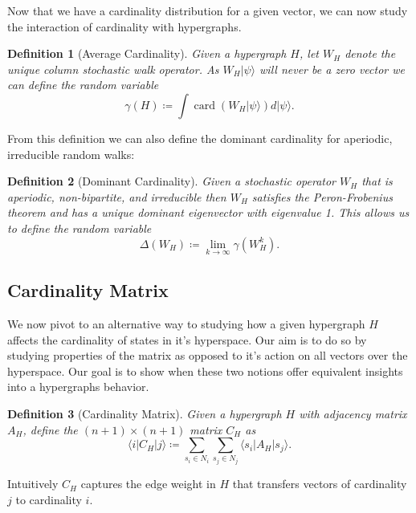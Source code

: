 \documentclass{article}
\newcommand{\ket}[1]{|#1\rangle}
\newcommand{\bra}[1]{\langle #1|}
\newcommand{\parens}[1]{\left( #1 \right)}
\DeclareMathOperator{\card}{card}
\newcommand{\cardi}[1]{\card \parens{ #1 }}
\newcommand{\base}[1]{\ket{s_{#1}}}
\newcommand{\dual}[1]{\bra{s_{#1}}}
\newtheorem{defn}{Definition}
\begin{document}
Now that we have a cardinality distribution for a given vector, we can now study the interaction of cardinality with hypergraphs.
\begin{defn}[Average Cardinality]
    Given a hypergraph $H$, let $W_H$ denote the unique column stochastic walk operator. As $W_H \ket{\psi}$ will never be a zero vector we can define the random variable
    \begin{equation}
        \gamma(H) \coloneqq \int \cardi{W_H \ket{\psi}} d\ket{\psi}.
    \end{equation}
\end{defn}
From this definition we can also define the dominant cardinality for aperiodic, irreducible random walks:
\begin{defn}[Dominant Cardinality]
    Given a stochastic operator $W_H$ that is aperiodic, non-bipartite, and irreducible then $W_H$ satisfies the Peron-Frobenius theorem and has a unique dominant eigenvector with eigenvalue 1. This allows us to define the random variable
    \begin{equation}
        \Delta(W_H) \coloneqq \lim_{k \to \infty} \gamma(W_H^k).
    \end{equation}
\end{defn}

\subsection{Cardinality Matrix}
We now pivot to an alternative way to studying how a given hypergraph $H$ affects the cardinality of states in it's hyperspace. Our aim is to do so by studying properties of the matrix as opposed to it's action on all vectors over the hyperspace. Our goal is to show when these two notions offer equivalent insights into a hypergraphs behavior.

\begin{defn}[Cardinality Matrix]
    Given a hypergraph $H$ with adjacency matrix $A_H$, define the $(n+1) \times (n+1)$ matrix $C_H$ as
    \begin{equation}
        \bra{i} C_H \ket{j} \coloneqq \sum_{s_i \in N_i} \sum_{s_j \in N_j} \dual{i} A_H \base{j}.
    \end{equation}
\end{defn}
Intuitively $C_H$ captures the edge weight in $H$ that transfers vectors of cardinality $j$ to cardinality $i$. 
\end{document}
